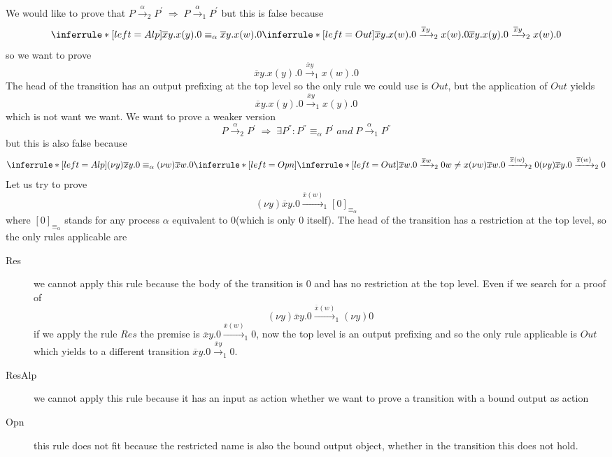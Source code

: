 We would like to prove that $P\xrightarrow{\alpha}_{2}P^{'}\; \Rightarrow\; P\xrightarrow{\alpha}_{1}P^{'}$ but this is false because
\[
  \inferrule* [left=Alp]{
      \overline{x}y.x(y).0 \equiv_{\alpha} \overline{x}y.x(w).0
    \\
      \inferrule* [left=Out]{
      }{
	\overline{x}y.x(w).0\xrightarrow{\overline{x}y}_{2}x(w).0
      }
  }{
    \overline{x}y.x(y).0\xrightarrow{\overline{x}y}_{2}x(w).0
  }
\]
so we want to prove 
\[
  \overline{x}y.x(y).0\xrightarrow{\overline{x}y}_{1}x(w).0
\] 
The head of the transition has an output prefixing at the top level so the only rule we could use is $Out$, but the application of $Out$ yields 
\[
  \overline{x}y.x(y).0\xrightarrow{\overline{x}y}_{1}x(y).0
\] 
which is not want we want. We want to prove a weaker version
\[
  P\xrightarrow{\alpha}_{2}P^{'}\; \Rightarrow\; \exists P^{''}: P^{''}\equiv_{\alpha}P^{'}\; and\; P\xrightarrow{\alpha}_{1}P^{''}
\]
but this is also false because 
\[
  \inferrule* [left=Alp]{
      (\nu y)\overline{x}y.0 \equiv_{\alpha} (\nu w)\overline{x}w.0
    \\
      \inferrule* [left=Opn]{
	  \inferrule* [left=Out]{
	  }{
	    \overline{x}w.0\xrightarrow{\overline{x}w}_{2}0
	  }
	\\
	  w\neq x
      }{
	(\nu w)\overline{x}w.0\xrightarrow{\overline{x}(w)}_{2}0
      }
  }{
    (\nu y)\overline{x}y.0\xrightarrow{\overline{x}(w)}_{2}0
  }
\]
Let us try to prove 
\[
  (\nu y)\overline{x}y.0\xrightarrow{\overline{x}(w)}_{1}[0]_{\equiv_{\alpha}}
\]
where $[0]_{\equiv_{\alpha}}$ stands for any process $\alpha$ equivalent to $0$(which is only $0$ itself). The head of the transition has a restriction at the top level, so the only rules applicable are 
\begin{description}
  \item[Res]
    we cannot apply this rule because the body of the transition is $0$ and has no restriction at the top level. Even if we search for a proof of
    \[
      (\nu y)\overline{x}y.0\xrightarrow{\overline{x}(w)}_{1}(\nu y)0
    \]
    if we apply the rule $Res$ the premise is $\overline{x}y.0\xrightarrow{\overline{x}(w)}_{1}0$, now the top level is an output prefixing and so the only rule applicable is $Out$ which yields to a different transition $\overline{x}y.0\xrightarrow{\overline{x}y}_{1}0$.
  \item[ResAlp]
    we cannot apply this rule because it has an input as action whether we want to prove a transition with a bound output as action
  \item[Opn]
    this rule does not fit because the restricted name is also the bound output object, whether in the transition this does not hold.
\end{description}


